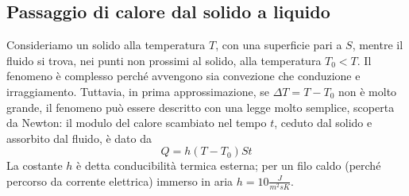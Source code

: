 \documentclass[class=book, crop=false, oneside, 12pt]{standalone}
\begin{document}
\subsection{Passaggio di calore dal solido a liquido}

Consideriamo un solido alla temperatura \(T\), con una superficie pari a \(S\), mentre il fluido si trova, nei punti non prossimi al solido, alla temperatura \(T_0 < T\). 
Il fenomeno è complesso perché avvengono sia convezione che conduzione e irraggiamento. 
Tuttavia, in prima approssimazione, se \(\Delta T = T - T_0 \) non è molto grande, il fenomeno può essere descritto con una legge molto semplice, scoperta da Newton: il modulo del calore scambiato nel tempo \(t\), ceduto dal solido e assorbito dal fluido, è dato da
\begin{equation}
    Q = h (T-T_0) S t
\end{equation}
La costante \(h\) è detta conducibilità termica esterna; per un filo caldo (perché percorso da corrente elettrica) immerso in aria \(h = 10 \frac{J}{m^2 s K}\). 
\end{document}
